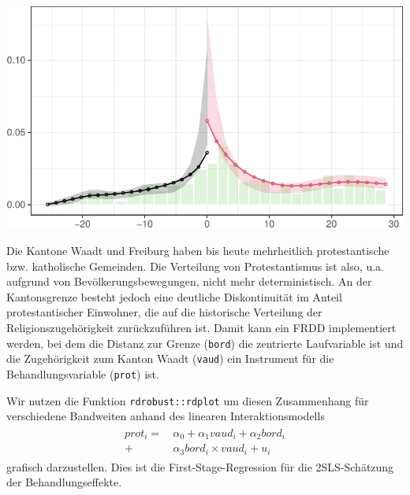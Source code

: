 \documentclass[
  a4paper,
  DIV=11,
  oneside]{scrreprt}
\newenvironment{Shaded}{\begin{snugshade}}{\end{snugshade}}
\newcommand{\AttributeTok}[1]{\textcolor[rgb]{0.40,0.45,0.13}{#1}}
\newcommand{\CommentTok}[1]{\textcolor[rgb]{0.37,0.37,0.37}{#1}}
\newcommand{\DecValTok}[1]{\textcolor[rgb]{0.68,0.00,0.00}{#1}}
\newcommand{\FunctionTok}[1]{\textcolor[rgb]{0.28,0.35,0.67}{#1}}
\newcommand{\NormalTok}[1]{\textcolor[rgb]{0.00,0.23,0.31}{#1}}
\newcommand{\OtherTok}[1]{\textcolor[rgb]{0.00,0.23,0.31}{#1}}
\newcommand{\SpecialCharTok}[1]{\textcolor[rgb]{0.37,0.37,0.37}{#1}}
\newcommand{\StringTok}[1]{\textcolor[rgb]{0.13,0.47,0.30}{#1}}
\begin{document}
\begin{Shaded}
\end{Shaded}

\begin{center}
\includegraphics{RDD_files/figure-pdf/unnamed-chunk-38-1.pdf}
\end{center}

Die Kantone Waadt und Freiburg haben bis heute mehrheitlich
protestantische bzw. katholische Gemeinden. Die Verteilung von
Protestantismus ist also, u.a. aufgrund von Bevölkerungsbewegungen,
nicht mehr deterministisch. An der Kantonsgrenze besteht jedoch eine
deutliche Diskontinuität im Anteil protestantischer Einwohner, die auf
die historische Verteilung der Religionszugehörigkeit zurückzuführen
ist. Damit kann ein FRDD implementiert werden, bei dem die Distanz zur
Grenze (\texttt{bord}) die zentrierte Laufvariable ist und die
Zugehörigkeit zum Kanton Waadt (\texttt{vaud}) ein Instrument für die
Behandlungsvariable (\texttt{prot}) ist.

Wir nutzen die Funktion \texttt{rdrobust::rdplot} um diesen Zusammenhang
für verschiedene Bandweiten anhand des linearen Interaktionsmodells
\begin{align}
  \begin{split}
  prot_i =&\, \alpha_0 + \alpha_1 vaud_i + \alpha_2 bord_i \\
  +&\, \alpha_3 bord_i \times vaud_i + u_i
  \end{split}\label{eq:BBFSR}
\end{align} grafisch darzustellen. Dies ist die First-Stage-Regression
für die 2SLS-Schätzung der Behandlungseffekte.
\end{document}
